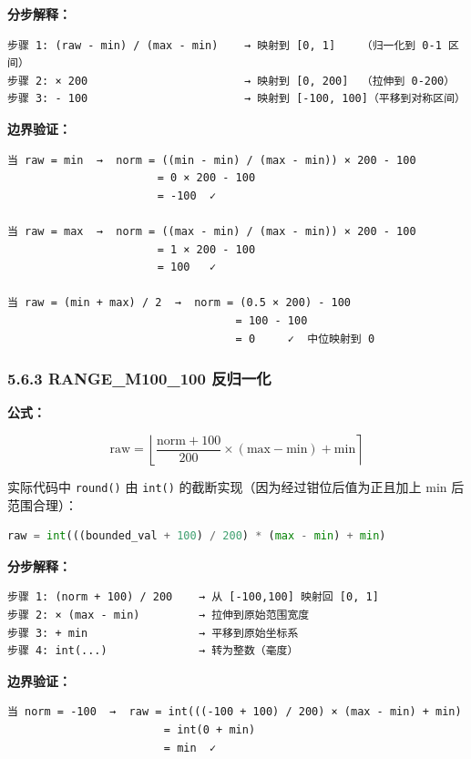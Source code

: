 \documentclass[UTF8,a4paper,11pt]{ctexart}
\begin{document}
{\textbf{分步解释：}

\begin{lstlisting}[language=text]
步骤 1: (raw - min) / (max - min)    → 映射到 [0, 1]    （归一化到 0-1 区间）
步骤 2: × 200                        → 映射到 [0, 200]  （拉伸到 0-200）
步骤 3: - 100                        → 映射到 [-100, 100]（平移到对称区间）
\end{lstlisting}

\textbf{边界验证：}

\begin{lstlisting}[language=text]
当 raw = min  →  norm = ((min - min) / (max - min)) × 200 - 100
                       = 0 × 200 - 100
                       = -100  ✓

当 raw = max  →  norm = ((max - min) / (max - min)) × 200 - 100
                       = 1 × 200 - 100
                       = 100   ✓

当 raw = (min + max) / 2  →  norm = (0.5 × 200) - 100
                                   = 100 - 100
                                   = 0     ✓  中位映射到 0
\end{lstlisting}

\subsubsection{5.6.3 RANGE_M100_100 反归一化}

\textbf{公式：}

$$\text{raw} = \left\lfloor \frac{\text{norm} + 100}{200} \times (\text{max} - \text{min}) + \text{min} \right\rceil$$

实际代码中 \texttt{round()} 由 \texttt{int()} 的截断实现（因为经过钳位后值为正且加上 min 后范围合理）：

\begin{lstlisting}[language=python]
raw = int(((bounded_val + 100) / 200) * (max - min) + min)
\end{lstlisting}

\textbf{分步解释：}

\begin{lstlisting}[language=text]
步骤 1: (norm + 100) / 200    → 从 [-100,100] 映射回 [0, 1]
步骤 2: × (max - min)         → 拉伸到原始范围宽度
步骤 3: + min                 → 平移到原始坐标系
步骤 4: int(...)              → 转为整数（毫度）
\end{lstlisting}

\textbf{边界验证：}

\begin{lstlisting}[language=text]
当 norm = -100  →  raw = int(((-100 + 100) / 200) × (max - min) + min)
                        = int(0 + min)
                        = min  ✓


\end{lstlisting}}
\end{document}

